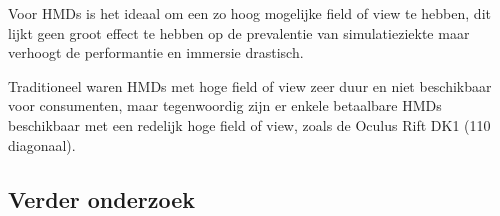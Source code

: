 \documentclass[a4paper,12pt]{article}
\begin{document}
Voor HMDs is het ideaal om een zo hoog mogelijke field of view te hebben, dit
lijkt geen groot effect te hebben op de prevalentie van 
simulatieziekte\cite{arthur00} maar verhoogt de performantie en immersie
drastisch\cite{arthur00}.

Traditioneel waren HMDs met hoge field of view zeer duur en niet beschikbaar voor
consumenten, maar tegenwoordig zijn er enkele betaalbare HMDs beschikbaar met een
redelijk hoge field of view, zoals de Oculus Rift DK1 (110\textdegree{} 
diagonaal).


\subsection{Verder onderzoek}


\newpage


\end{document}
